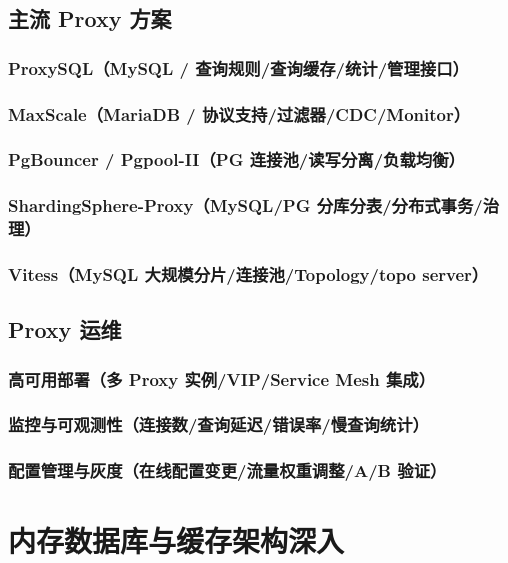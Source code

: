 \documentclass[12pt,UTF8]{ctexbook}
\begin{document}
  \section{主流 Proxy 方案}
    \subsection{ProxySQL（MySQL / 查询规则/查询缓存/统计/管理接口）}
    \subsection{MaxScale（MariaDB / 协议支持/过滤器/CDC/Monitor）}
    \subsection{PgBouncer / Pgpool-II（PG 连接池/读写分离/负载均衡）}
    \subsection{ShardingSphere-Proxy（MySQL/PG 分库分表/分布式事务/治理）}
    \subsection{Vitess（MySQL 大规模分片/连接池/Topology/topo server）}

  \section{Proxy 运维}
    \subsection{高可用部署（多 Proxy 实例/VIP/Service Mesh 集成）}
    \subsection{监控与可观测性（连接数/查询延迟/错误率/慢查询统计）}
    \subsection{配置管理与灰度（在线配置变更/流量权重调整/A/B 验证）}


\chapter{内存数据库与缓存架构深入}
\label{chap:inmemory-cache-arch}
\end{document}

